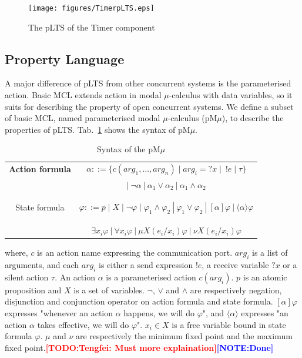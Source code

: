 \documentclass[runningheads,a4paper]{llncs}
\newcommand{\TODO}[1]{\textcolor{red}{\textbf{[TODO:#1]}}}
\newcommand{\NOTE}[1]{\textcolor{blue}{\textbf{[NOTE:#1]}}}
\begin{document}
\begin{figure}[ht]
  \centering
  \texttt{[image: figures/TimerpLTS.eps]}
  \caption{The pLTS of the Timer component}
  \label{schema:Timer:pLTS}
\end{figure}



\subsection{Property Language}

A major difference of pLTS from other concurrent systems is the parameterised action. Basic MCL\cite{radu2008mcl} extends action in modal $\mu$-calculus with data variables, so it suits for describing the property of open concurrent systems. We define a subset of basic MCL, named parameterised modal $\mu$-calculus (pM$\mu$), to describe the properties of pLTS. Tab.~\ref{mcl} shows the syntax of pM$\mu$.

\begin{table}
	\setlength\tabcolsep{18pt}%
	\centering 
	\caption{Syntax of the pM$\mu$} 
	\label{mcl}
	\begin{tabular}{>{\bfseries}c| c } 
		\hline 		
	Action formula 	&     $\alpha ::= \{c(arg_{1}, ..., arg_{n})\mid arg_{i}=?x\mid\ !e\mid \tau\}$                  \\
	& $|\ \neg\alpha \ |\ \alpha_{1}\vee\alpha_{2}\ |\ \alpha_{1}\wedge\alpha_{2}$   \\ 	\hline 
		
	State formula 	&  $\varphi ::= p \mid X \mid \neg\varphi \mid \varphi_{1}\wedge\varphi_{2}\ |\ \varphi_{1}\vee\varphi_{2} \ |\ [\alpha]\varphi \ |\ \langle\alpha\rangle\varphi$ \\ 
	& $\exists x_{i}\varphi\ |\ \forall x_{i}\varphi\ |\ \mu X(e_{i}/x_{i})\varphi\ |\ \nu X(e_{i}/x_{i})\varphi$	\\ \hline 
	\end{tabular} 
\end{table} 
 
 where, $c$ is an action name expressing the communication port. $arg_{i}$ is a list of arguments, and each $arg_{i}$ is either a send expression $!e$, a receive variable $?x$ or a silent action $\tau$. An action $\alpha$ is a parameterised action $c(arg_{i})$. $p$ is an atomic proposition and $X$ is a set of variables. $\neg$, $\vee$ and $\wedge$ are respectively negation, disjunction and conjunction operator on action formula and state formula. $[\alpha]\varphi$ expresses "whenever an action $\alpha$ happens, we will do $\varphi$", and $\langle\alpha\rangle$ expresses "an action $\alpha$ takes effective, we will do $\varphi$". $x_{i}\in X$ is a free variable bound in state formula $\varphi$. $\mu$ and $\nu$ are respectively the minimum fixed point and the maximum fixed point.\TODO{Tengfei: Must more explaination}\NOTE{Done}
\end{document}
